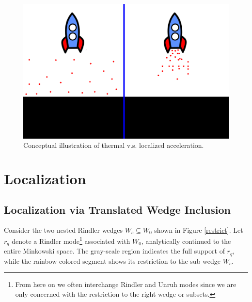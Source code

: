 \documentclass[12pt,a4paper]{article}
\begin{document}
\begin{figure}[h]
\centering
\includegraphics[scale=0.5]{rocket_inertial.png}
\caption{Conceptual illustration of thermal v.s. localized acceleration.}
\label{rocket_inertial}
\end{figure}

\section{Localization}
\subsection{Localization via Translated Wedge Inclusion}

Consider the two nested Rindler wedges $W_c \subseteq W_0$ shown in Figure \ref{restrict}. Let $r_q$ denote a Rindler mode\footnote{From here on we often interchange Rindler and Unruh modes since we are only concerned with the restriction to the right wedge or subsets.} associated with $W_0$, analytically continued to the entire Minkowski space. The gray-scale region indicates the full support of $r_q$, while the rainbow-colored segment shows its restriction to the sub-wedge $W_c$.
\end{document}
